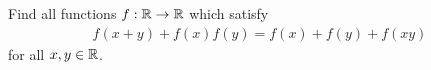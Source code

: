 Find all functions $f:\mathbb R \to \mathbb R$ which satisfy
\begin{align*}
    f(x+y)+f(x)f(y) = f(x)+f(y)+f(xy)
\end{align*}
for all $x,y \in \mathbb R$.